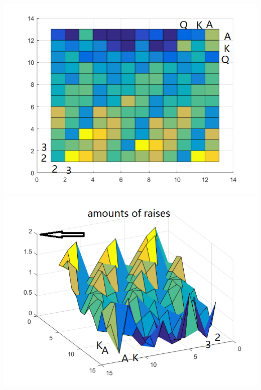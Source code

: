 \documentclass[12pt]{article}
\begin{document}
\includegraphics[scale=.5]{AEL5}
\includegraphics[scale=.5]{AEL51}
\end{document}
